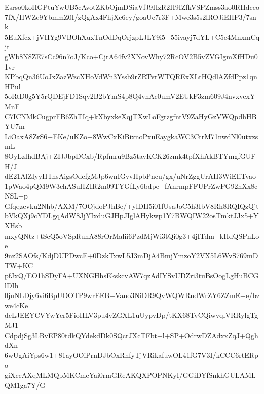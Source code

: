 Esrso0koHGPtuYwUB5cAvotZKbOjmDSiaVfJ9HzR2H9IZfkVSPZmss3ao0RHdceo
7fX/HWZc9YbmmZ0I/zQgAx4FhjXe6ey/goaUe7r3F+Mwe3s5s2lROJiEHP3/7snk
5EuXfcx+jVHYg9VBOhXuxTnOdDqOrjzpLJLY9i5+55ivayj7dYL+C5e4MnxmCqjt
gWb8N8ZE7sCc96n7oJ/Kco+CjrA64fv2XNovWhy72RcOV2B5vZVGIgmXfHDu01vr
KPbqQn36UoJxZazWzcXHoVdWn3Yssb9rZRTvrWTQRExXLtHQdlAZfdPpz1qnHPul
5oRtD0g5Y5rQDEjFD1Sqv2B2bYmS4p8Q4vnAc0umV2EUkF3zm609J4nvxvcxYMnF
C7ICNMkCugprFB6ZhTIq+kXbyxkeXqjTXwLoFgrzgfntV9ZaHyGzVWQpdhHBYU7m
LiOaxA8ZrS6+EKe/uKZo+8WwCxKiBixnoPxuEaygkaWC3CtrM71nwdNl0utxzsmL
8OyLzIhdBAj+ZIJJbpDCxb/Rpfmru9Bz5tavKCK26zmk4tpfXhAkBTYmgfGUFH/J
dE21AlZIyyHTnsAigsOdefgMJp6wnIGvvHpbPncu/gx/uNrZggUrAH3WiEIiTvao
1pWao4pQM9W3chASuHZIR2m09TYGfLy6bdpe+fAnrmpFFUPrZwPG92hXx8cNSL+p
Gfqqzcvku2Nhb/AXM/7OOjdoPJhBe/+ylDH5i01fUsaJoC5h3IbV8Rh8RQIQzQjt
bVkQXj9cYDLgqAdW8JjYIxduGJHpJIglAHykwp1Y7BWQIW22osTmktJJx5+YXHsb
mxyQNtz+tScQ5oVSpRunA88rOrMalii6PzdMjWi3tQi0g3+4jITdm+kHdQSPnLoe
9nz2SAOfs/KdjDUPDwcE+0DzkTxwL5J3mDjA4BmjYmzoY2VX5L6WvS769mDTW+KC
pfJxQ/EO1hSDyFA+UXNGHhsEkskcvAW7qzAdIYSvUDZri3tuBsOogLgHuBCGlDIh
0juNLDjy6vi6BpUOOTP9wrEEB+Vano3NiDR9QvWQWRndWrZY6ZZmE+e/bzwe4cKe
dcLJEEYCVYwYer5FioHLV3pu4vZGXL1uUypvDp/tKX68TvCQiwvqlVRRylgTgMJ1
CdpdjSg3LBvEP80tdkQYdekdDk0SQcrJXcTFbt+l+SP+OdrwDZAdxxZqJ+QghdXn
6wUgAiYps6w1+81ayOOiPrnDJbOxRhfyTjVRikafuwOL41fG7V3I/kCCC6rtERpo
giXccAXqMLMQpMKCmeYai0rmGReAKQXPOPNKyI/GGiDYfSnkhGULAMLQM1ga7Y/G
